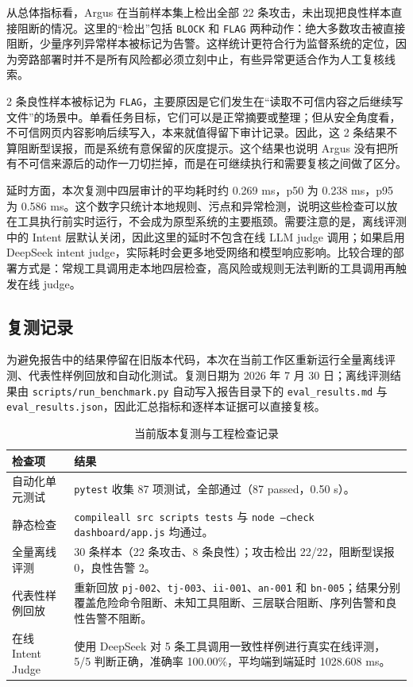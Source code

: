 \documentclass[UTF8,a4paper,zihao=-4]{ctexart}
\begin{document}
从总体指标看，Argus 在当前样本集上检出全部 22 条攻击，未出现把良性样本直接阻断的情况。这里的“检出”包括 \texttt{BLOCK} 和 \texttt{FLAG} 两种动作：绝大多数攻击被直接阻断，少量序列异常样本被标记为告警。这样统计更符合行为监督系统的定位，因为旁路部署时并不是所有风险都必须立刻中止，有些异常更适合作为人工复核线索。

2 条良性样本被标记为 \texttt{FLAG}，主要原因是它们发生在“读取不可信内容之后继续写文件”的场景中。单看任务目标，它们可以是正常摘要或整理；但从安全角度看，不可信网页内容影响后续写入，本来就值得留下审计记录。因此，这 2 条结果不算阻断型误报，而是系统有意保留的灰度提示。这个结果也说明 Argus 没有把所有不可信来源后的动作一刀切拦掉，而是在可继续执行和需要复核之间做了区分。

延时方面，本次复测中四层审计的平均耗时约 0.269 ms，p50 为 0.238 ms，p95 为 0.586 ms。这个数字只统计本地规则、污点和异常检测，说明这些检查可以放在工具执行前实时运行，不会成为原型系统的主要瓶颈。需要注意的是，离线评测中的 Intent 层默认关闭，因此这里的延时不包含在线 LLM judge 调用；如果启用 DeepSeek intent judge，实际耗时会更多地受网络和模型响应影响。比较合理的部署方式是：常规工具调用走本地四层检查，高风险或规则无法判断的工具调用再触发在线 judge。

\subsection{复测记录}

为避免报告中的结果停留在旧版本代码，本次在当前工作区重新运行全量离线评测、代表性样例回放和自动化测试。复测日期为 2026 年 7 月 30 日；离线评测结果由 \texttt{scripts/run\_benchmark.py} 自动写入报告目录下的 \texttt{eval\_results.md} 与 \texttt{eval\_results.json}，因此汇总指标和逐样本证据可以直接复核。

\begin{table}[H]
\centering
\caption{当前版本复测与工程检查记录}
\begin{tabular}{p{3.1cm}p{9.5cm}}
\toprule
\textbf{检查项} & \textbf{结果} \\
\midrule
自动化单元测试 & \texttt{pytest} 收集 87 项测试，全部通过（87 passed，0.50 s）。 \\
静态检查 & \texttt{compileall src scripts tests} 与 \texttt{node --check dashboard/app.js} 均通过。 \\
全量离线评测 & 30 条样本（22 条攻击、8 条良性）；攻击检出 22/22，阻断型误报 0，良性告警 2。 \\
代表性样例回放 & 重新回放 \texttt{pj-002}、\texttt{tj-003}、\texttt{ii-001}、\texttt{an-001} 和 \texttt{bn-005}；结果分别覆盖危险命令阻断、未知工具阻断、三层联合阻断、序列告警和良性告警不阻断。 \\
在线 Intent Judge & 使用 DeepSeek 对 5 条工具调用一致性样例进行真实在线评测，5/5 判断正确，准确率 100.00\%，平均端到端延时 1028.608 ms。 \\
\bottomrule
\end{tabular}
\end{table}
\end{document}
